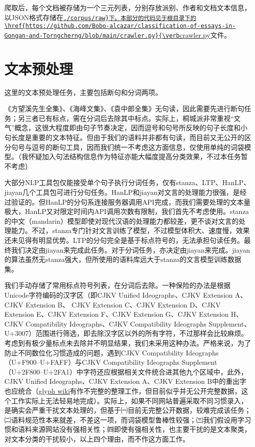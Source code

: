 \documentclass[12pt, a4paper, oneside]{ctexart}
\begin{document}
爬取后，每个文档被存储为一个三元列表，分别存放派别、作者和文档文本信息，以JSON格式存储在\href{https://github.com/Bobo-alcazar/classification-of-essays-in-Gongan-and-Torngcherng/tree/main/corpus/raw}{\verb!./corpus/raw}下。本部分的代码见于根目录下的\href{https://github.com/Bobo-alcazar/classification-of-essays-in-Gongan-and-Torngcherng/blob/main/crawler.py}{\verb!crawler.py}文件。

\section{文本预处理}

这里的文本预处理任务，主要包括断句和分词两项。

《方望溪先生全集》、《海峰文集》、《袁中郎全集》无句读，因此需要先进行断句任务；另三者已有标点，需在分词后去除其中标点。实际上，桐城派非常重视“文气”概念，这很大程度即由句子节奏决定，因而逗号和句号所反映的句子长度和小句长度是重要的文本特征。但由于我们的语料并非都有句读，而目前又无公开的区分句号与逗号的断句工具，因而我们统一不考虑这方面信息，仅使用单纯的词袋模型。（我怀疑加入句法结构信息作为特征亦能大幅度提高分类效果，不过本任务暂不考虑）

大部分NLP工具包仅能接受单个句子执行分词任务，仅有stanza、LTP、HanLP、jiayan几个工具包可进行分句任务。HanLP和jiayan对文言的处理能力很强，是经过验证的。但HanLP的分句系连接服务器调用API完成，而我们需要处理的文本量极大，HanLP又对限定时间内API调用次数有限制，我们首先不考虑使用。stanza的中文（mandarin）模型即使对现代汉语的处理能力都较差，更不谈对文言的处理能力。不过，stanza专门针对文言训练了模型，不过模型体积大、速度慢，效果还未见得有明显优势。LTP的分句完全是基于标点符号的，无法承担句读任务。最终我们决定由jiayan来完成此任务。对于分词任务，亦决定由jiayan来完成。jiayan的算法虽然无stanza强大，但所使用的语料库远大于stanza的文言模型训练数据集。

我们手动存储了常用标点符号列表，在分词后去除。一种保险的办法是根据Unicode字符编码的汉字区（即CJKV Unified Ideographs、CJKV Extension A、CJKV Extension B、
CJKV Extension C、CJKV Extension D、CJKV Extension E、CJKV Extension F、CJKV Extension G、CJKV Extension H、CJKV Compatibility Ideographs、CJKV Compatibility Ideographs Supplement、U+3007）范围进行筛选，即去除汉字区以外的所有字符，不过那样会比较麻烦。考虑到有极少量标点未去除并不明显结果，我们未采用这种办法。严格来说，为了防止不同数位化习惯造成的问题，遇到CJKV Compatibility Ideographs（U+F900–U+FAFF）与CJKV Compatibility Ideographs Supplement（U+2F800–U+2FA1）中字符还应根据相关文件统合进其他九个区域中，此外，CJKV Unified Ideographs、CJKV Extension A、CJKV Extension B中的重出字也应统合（\href{https://glyphwiki.org/wiki/Group:原規格分離}{glyph wiki}有作不完整的整理工作，但目前似乎并无公开完整数据，这个工作实际上无法轻易地完成）。实际上，如果不同网站普遍采取不同习惯录入，是确实会严重干扰文本处理的，但基于㈠目前无完整公开数据，较难完成该任务；㈡语料规范性本来就差，不差这一项，而词袋模型鲁棒性较强；㈢我们假设用字习惯和语料来源网站没有强相关性；㈣即使有强相关性，也主要干扰的是文本聚类，对文本分类的干扰较小，以上四个理由，而不作这方面工作。
\end{document}
